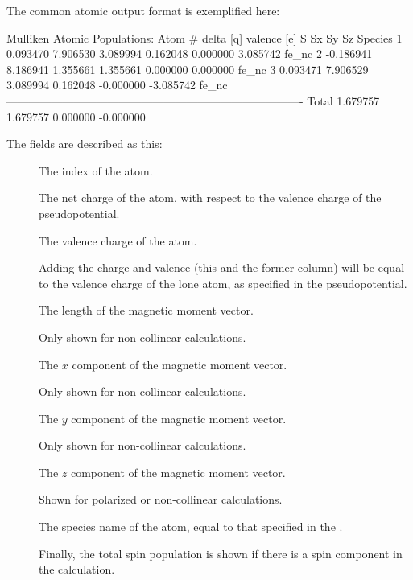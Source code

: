 The common atomic output format is exemplified here:
\begin{output}[fontsize=\footnotesize]
Mulliken Atomic Populations:
Atom #    delta [q] valence [e]           S          Sx          Sy          Sz  Species
     1     0.093470    7.906530    3.089994    0.162048    0.000000    3.085742  fe_nc
     2    -0.186941    8.186941    1.355661    1.355661    0.000000    0.000000  fe_nc
     3     0.093471    7.906529    3.089994    0.162048   -0.000000   -3.085742  fe_nc
-------------------------------------------------------------------------------
 Total                             1.679757    1.679757    0.000000   -0.000000
\end{output}
The fields are described as this:
\begin{description}

  \item[]%
    The index of the atom.

  \item[]%
    The net charge of the atom, with respect to the valence charge of the
    pseudopotential.

  \item[]%
    The valence charge of the atom.

    Adding the charge and valence (this and the former column) will be
    equal to the valence charge of the lone atom, as specified in the
    pseudopotential.

  \item[]%
    The length of the magnetic moment vector.

    Only shown for non-collinear calculations.
  
  \item[]%
    The $x$ component of the magnetic moment vector.

    Only shown for non-collinear calculations.
  
  \item[]%
    The $y$ component of the magnetic moment vector.

    Only shown for non-collinear calculations.
  
  \item[]%
    The $z$ component of the magnetic moment vector.

    Shown for polarized or non-collinear calculations.

  \item[]%
    The species name of the atom, equal to that specified in the
    .

  \item[]%
    Finally, the total spin population is shown if there is a spin
    component in the calculation.

\end{description}


